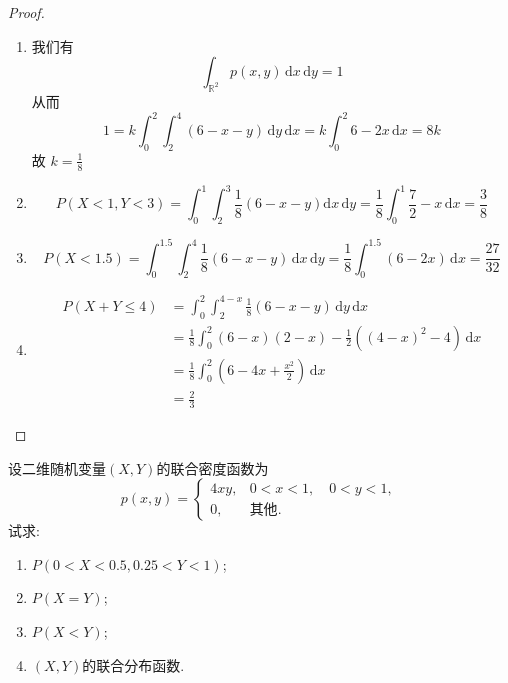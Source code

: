 \documentclass[../main.tex]{subfiles}
\begin{document}
\begin{proof}
  \begin{enumerate}
    \item 我们有 \[
    \int_{\mathbb{R} ^{2}}p\left( x,y \right)\,\mathrm{d} x\,\mathrm{d} y= 1 
    \]从而 \[
 1=  k \int_{0}^{2} \int_{2}^{4}\left( 6-x-y \right)\,\mathrm{d} y\,\mathrm{d} x=  k \int_{0}^{2}6-2x\,\mathrm{d} x= 8k
    \]故 \(  k= \frac{1 }{8 }   \) 
    \item \[
    P\left( X< 1,Y< 3 \right)=  \int_{0}^{1} \int_{2}^{3} \frac{1 }{8 }\left( 6-x-y \right)  \mathrm{d} x\,\mathrm{d} y  = \frac{1 }{8 } \int_{0}^{1}\frac{7 }{2 }-x\,\mathrm{d} x= \frac{3 }{8 }    
    \]
    \item \[
    P\left( X< 1.5 \right)= \int_{0}^{1.5}\int_{2}^{4}\frac{1 }{8 }\left( 6-x-y \right)\,\mathrm{d} x\,\mathrm{d} y= \frac{1 }{8 } \int_{0}^{1.5}\left( 6-2x \right)\,\mathrm{d} x= \frac{27 }{32 }      
    \]
    \item \[
   \begin{aligned}
    P\left( X+ Y\le 4 \right)&= \int_{0}^{2} \int_{2}^{4-x}\frac{1 }{8 }\left( 6-x-y \right)\,\mathrm{d} y\,\mathrm{d} x\\ 
     &= \frac{1 }{8 } \int_{0}^{2}\left( 6-x \right)\left( 2-x \right)-\frac{1 }{2 }\left( \left( 4-x \right)^{2}-4  \right)    \,\mathrm{d} x\\ 
      &= \frac{1 }{8 }\int_{0}^{2}\left( 6-4x+ \frac{x^{2} }{2 }  \right)\,\mathrm{d} x\\ 
       &= \frac{2 }{3 }   
   \end{aligned}       
    \]
  \end{enumerate}
  
\end{proof}
\begin{exercise}{}{}
设二维随机变量$(X,Y)$的联合密度函数为
\[
p(x,y) = \begin{cases}
4xy, & 0 < x < 1, \quad 0 < y < 1, \\
0, & \text{其他}.
\end{cases}
\]
试求:

\begin{enumerate}
\item $P(0<X<0.5, 0.25<Y<1)$;
\item $P(X=Y)$;
\item $P(X<Y)$;
\item $(X,Y)$的联合分布函数.
\end{enumerate}
\end{exercise}
\end{document}
